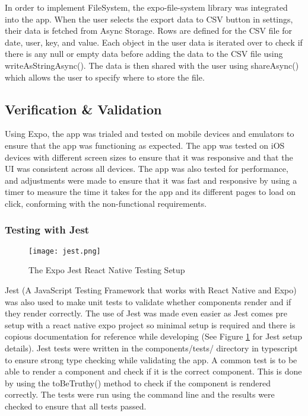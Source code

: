 In order to implement FileSystem, the expo-file-system library was integrated into the app. When the user selects the export data to CSV button in settings, their data is fetched from Async Storage. Rows are defined for the CSV file for date, user, key, and value. Each object in the user data is iterated over to check if there is any null or empty data before adding the data to the CSV file using writeAsStringAsync(). The data is then shared with the user using shareAsync() which allows the user to specify where to store the file.

\subsection{Verification \& Validation}
Using Expo, the app was trialed and tested on mobile devices and emulators to ensure that the app was functioning as expected. The app was tested on iOS devices with different screen sizes to ensure that it was responsive and that the UI was consistent across all devices. The app was also tested for performance, and adjustments were made to ensure that it was fast and responsive by using a timer to measure the time it takes for the app and its different pages to load on click, conforming with the non-functional requirements. 

\subsubsection{Testing with Jest}

\begin{figure}[h!!]
    \begin{center}
      \texttt{[image: jest.png]}
      \caption{The Expo Jest React Native Testing Setup\cite{LevelUp2025}}
      \label{figure:jest}
    \end{center}
  \end{figure}
  
Jest (A JavaScript Testing Framework that works with React Native and Expo) was also used to make unit tests to validate whether components render and if they render correctly. The use of Jest was made even easier as Jest comes pre setup with a react native expo project so minimal setup is required and there is copious documentation for reference while developing (See Figure \ref{figure:jest} for Jest setup details). Jest tests were written in the components/tests/ directory in typescript to ensure strong type checking while validating the app. A common test is to be able to render a component and check if it is the correct component. This is done by using the toBeTruthy() method to check if the component is rendered correctly. The tests were run using the command line and the results were checked to ensure that all tests passed.
